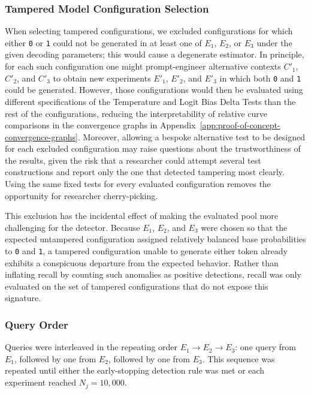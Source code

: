 \documentclass{article}
\begin{document}
\subsubsection{Tampered Model Configuration Selection}
\label{app:tampered-model-configuration-selection}

When selecting tampered configurations, we excluded configurations for
which either \texttt{0} or \texttt{1} could not be generated in at least one
of $E_1$, $E_2$, or $E_3$ under the given decoding parameters; this would cause a degenerate estimator. In principle, for each such
configuration one might prompt-engineer alternative contexts $C'_1$,
$C'_2$, and $C'_3$ to obtain new experiments $E'_1$, $E'_2$, and $E'_3$ in
which both \texttt{0} and \texttt{1} could be generated. However, those
configurations would then be evaluated using different specifications of the
Temperature and Logit Bias Delta Tests than the rest of the configurations, reducing the interpretability of relative curve comparisons in the convergence graphs in Appendix~\ref{app:proof-of-concept-convergence-graphs}. Moreover, allowing a bespoke alternative test to be designed for each excluded
configuration may raise questions about the trustworthiness of the results,
given the risk that a researcher could attempt several test constructions and
report only the one that detected tampering most clearly. Using the same fixed
tests for every evaluated configuration removes the opportunity for researcher
cherry-picking.

This exclusion has the incidental effect of making the evaluated pool more
challenging for the detector. Because $E_1$, $E_2$, and $E_3$ were chosen so
that the expected untampered configuration assigned relatively balanced base
probabilities to \texttt{0} and \texttt{1}, a tampered configuration unable to
generate either token already exhibits a conspicuous departure from the
expected behavior. Rather than inflating recall by counting such anomalies as
positive detections, recall was only evaluated on the set of tampered
configurations that do not expose this signature.

\subsubsection{Query Order}

Queries were interleaved in the repeating order
$E_1\rightarrow E_2\rightarrow E_3$: one query from $E_1$, followed by one
from $E_2$, followed by one from $E_3$. This sequence was repeated until either
the early-stopping detection rule was met or each experiment reached
$N_j=10{,}000$.
\end{document}
